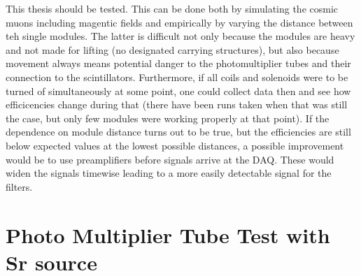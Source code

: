   This thesis should be tested. This can be done both by simulating the cosmic muons including magentic fields and empirically by varying the distance between teh single modules. The latter is difficult not only because the modules are heavy and not made for lifting (no designated carrying structures), but also because movement always means potential danger to the photomultiplier tubes and their connection to the scintillators.
  Furthermore, if all coils and solenoids were to be turned of simultaneously at some point, one could collect data then and see how efficicencies change during that (there have been runs taken when that was still the case, but only few modules were working properly at that point).
  If the dependence on module distance turns out to be true, but the efficiencies are still below expected values at the lowest possible distances, a possible improvement would be to use preamplifiers before signals arrive at the DAQ. These would widen the signals timewise leading to a more easily detectable signal for the filters.
  
  \section{Photo Multiplier Tube Test with Sr source}
  \label{ch:Analysis:sec:PhotoMultiplierTests}
  
